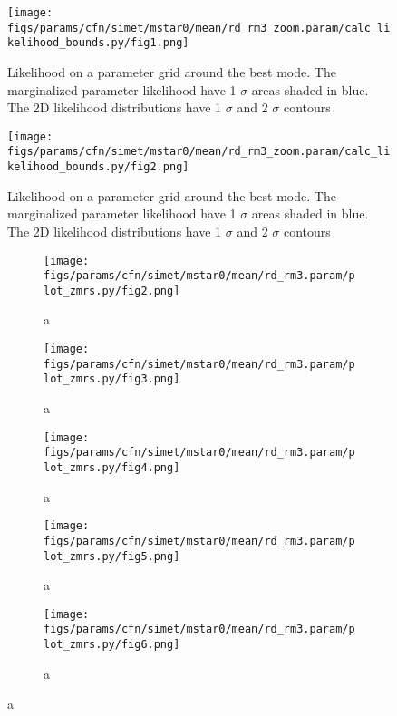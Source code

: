 \documentclass[twocolumn]{article}
\begin{document}
\begin{figure}[H]
  \center\texttt{[image: figs/params/cfn/simet/mstar0/mean/rd\_rm3\_zoom.param/calc\_likelihood\_bounds.py/fig1.png]}
  \caption{Likelihood on a parameter grid around the best mode. The marginalized parameter likelihood have
    1 $\sigma$ areas shaded in blue. The 2D likelihood distributions have 1 $\sigma$  and 2 $\sigma$ contours}
  \label{fig:basic_rd:likelihood}
\end{figure}

\begin{figure}[H]
  \center\texttt{[image: figs/params/cfn/simet/mstar0/mean/rd\_rm3\_zoom.param/calc\_likelihood\_bounds.py/fig2.png]}
  \caption{Likelihood on a parameter grid around the best mode. The marginalized parameter likelihood have
    1 $\sigma$ areas shaded in blue. The 2D likelihood distributions have 1 $\sigma$  and 2 $\sigma$ contours}
  \label{fig:basic_rd:likelihood}
\end{figure}


\begin{figure}
  \begin{subfigure}{.5\textwidth}
    \centering\texttt{[image: figs/params/cfn/simet/mstar0/mean/rd\_rm3.param/plot\_zmrs.py/fig2.png]}
    \caption{a}
  \end{subfigure}
  \begin{subfigure}{.5\textwidth}
    \centering\texttt{[image: figs/params/cfn/simet/mstar0/mean/rd\_rm3.param/plot\_zmrs.py/fig3.png]}
    \caption{a}
  \end{subfigure}
  \begin{subfigure}{.5\textwidth}
    \centering\texttt{[image: figs/params/cfn/simet/mstar0/mean/rd\_rm3.param/plot\_zmrs.py/fig4.png]}
    \caption{a}
  \end{subfigure}%
  \begin{subfigure}{.5\textwidth}
    \centering\texttt{[image: figs/params/cfn/simet/mstar0/mean/rd\_rm3.param/plot\_zmrs.py/fig5.png]}
    \caption{a}
  \end{subfigure}
  \begin{subfigure}{.5\textwidth}
    \centering\texttt{[image: figs/params/cfn/simet/mstar0/mean/rd\_rm3.param/plot\_zmrs.py/fig6.png]}
    \caption{a}
  \end{subfigure}
  
\end{figure}
\clearpage
\end{document}
